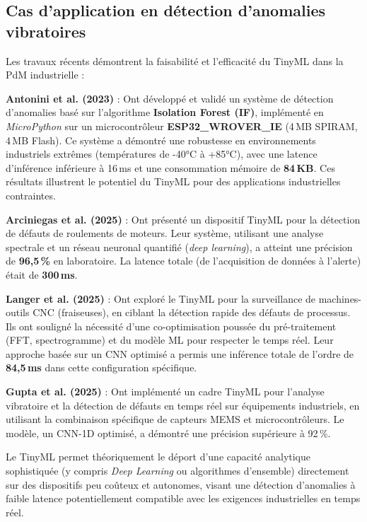 \subsection{Cas d'application en détection d'anomalies vibratoires}

Les travaux récents démontrent la faisabilité et l'efficacité du TinyML dans la PdM industrielle :

\textbf{Antonini et al. (2023)} \cite{antonini2023} : Ont développé et validé un système de détection d'anomalies basé sur l'algorithme \textbf{Isolation Forest (IF)}, implémenté en \textit{MicroPython} sur un microcontrôleur \textbf{ESP32\_WROVER\_IE} (4\,MB SPIRAM, 4\,MB Flash). Ce système a démontré une robustesse en environnements industriels extrêmes (températures de -40°C à +85°C), avec une latence d'inférence inférieure à 16\,ms et une consommation mémoire de \textbf{84\,KB}. Ces résultats illustrent le potentiel du TinyML pour des applications industrielles contraintes.

\textbf{Arciniegas et al. (2025)} \cite{arciniegas2025} : Ont présenté un dispositif TinyML pour la détection de défauts de roulements de moteurs. Leur système, utilisant une analyse spectrale et un réseau neuronal quantifié (\textit{deep learning}), a atteint une précision de \textbf{96,5\,\%} en laboratoire. La latence totale (de l'acquisition de données à l'alerte) était de \textbf{300\,ms}.

\textbf{Langer et al. (2025)} \cite{langer2025} : Ont exploré le TinyML pour la surveillance de machines-outils CNC (fraiseuses), en ciblant la détection rapide des défauts de processus. Ils ont souligné la nécessité d'une co-optimisation poussée du pré-traitement (FFT, spectrogramme) et du modèle ML pour respecter le temps réel. Leur approche basée sur un CNN optimisé a permis une inférence totale de l'ordre de \textbf{84,5\,ms} dans cette configuration spécifique.

\textbf{Gupta et al. (2025)} \cite{gupta2025} : Ont implémenté un cadre TinyML pour l'analyse vibratoire et la détection de défauts en temps réel sur équipements industriels, en utilisant la combinaison spécifique de capteurs MEMS et microcontrôleurs. Le modèle, un CNN-1D optimisé, a démontré une précision supérieure à 92\,\%.

Le TinyML permet théoriquement le déport d'une capacité analytique sophistiquée (y compris \textit{Deep Learning} ou algorithmes d'ensemble) directement sur des dispositifs peu coûteux et autonomes, visant une détection d'anomalies à faible latence potentiellement compatible avec les exigences industrielles en temps réel.

